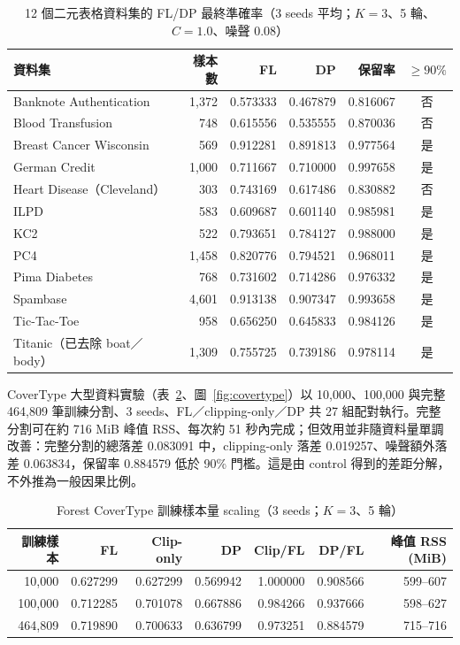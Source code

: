 \documentclass[12pt,a4paper]{article}
\begin{document}
\begin{table}[H]
\centering\small
\caption{12 個二元表格資料集的 FL/DP 最終準確率（3 seeds 平均；$K=3$、5 輪、$C=1.0$、噪聲 0.08）}
\label{tab:binary}
\begin{tabular}{lrrrrc}
\toprule
資料集 & 樣本數 & FL & DP & 保留率 & $\ge 90\%$ \\
\midrule
Banknote Authentication & 1,372 & 0.573333 & 0.467879 & 0.816067 & 否 \\
Blood Transfusion & 748 & 0.615556 & 0.535555 & 0.870036 & 否 \\
Breast Cancer Wisconsin & 569 & 0.912281 & 0.891813 & 0.977564 & 是 \\
German Credit & 1,000 & 0.711667 & 0.710000 & 0.997658 & 是 \\
Heart Disease（Cleveland） & 303 & 0.743169 & 0.617486 & 0.830882 & 否 \\
ILPD & 583 & 0.609687 & 0.601140 & 0.985981 & 是 \\
KC2 & 522 & 0.793651 & 0.784127 & 0.988000 & 是 \\
PC4 & 1,458 & 0.820776 & 0.794521 & 0.968011 & 是 \\
Pima Diabetes & 768 & 0.731602 & 0.714286 & 0.976332 & 是 \\
Spambase & 4,601 & 0.913138 & 0.907347 & 0.993658 & 是 \\
Tic-Tac-Toe & 958 & 0.656250 & 0.645833 & 0.984126 & 是 \\
Titanic（已去除 boat／body） & 1,309 & 0.755725 & 0.739186 & 0.978114 & 是 \\
\bottomrule
\end{tabular}
\end{table}

CoverType 大型資料實驗（表~\ref{tab:covertype}、圖~\ref{fig:covertype}）以 10,000、100,000 與完整 464,809 筆訓練分割、3 seeds、FL／clipping-only／DP 共 27 組配對執行。完整分割可在約 716 MiB 峰值 RSS、每次約 51 秒內完成；但效用並非隨資料量單調改善：完整分割的總落差 0.083091 中，clipping-only 落差 0.019257、噪聲額外落差 0.063834，保留率 0.884579 低於 90\% 門檻。這是由 control 得到的差距分解，不外推為一般因果比例。

\begin{table}[H]
\centering\small
\caption{Forest CoverType 訓練樣本量 scaling（3 seeds；$K=3$、5 輪）}
\label{tab:covertype}
\begin{tabular}{rrrrrrr}
\toprule
訓練樣本 & FL & Clip-only & DP & Clip/FL & DP/FL & 峰值 RSS (MiB) \\
\midrule
10,000 & 0.627299 & 0.627299 & 0.569942 & 1.000000 & 0.908566 & 599--607 \\
100,000 & 0.712285 & 0.701078 & 0.667886 & 0.984266 & 0.937666 & 598--627 \\
464,809 & 0.719890 & 0.700633 & 0.636799 & 0.973251 & 0.884579 & 715--716 \\
\bottomrule
\end{tabular}
\end{table}
\end{document}
